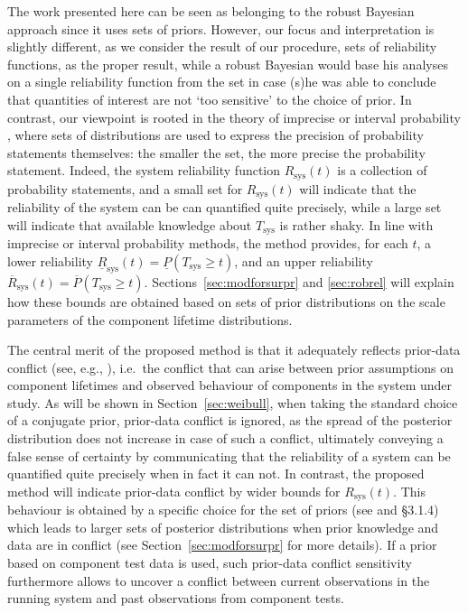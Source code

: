 \documentclass[Journal,SectionNumbers,InsideFigs]{ascelike}
\newcommand{\ul}[1]{\underline{#1}}
\newcommand{\ol}[1]{\overline{#1}}
\newcommand{\Rsys}{R_\text{sys}}
\newcommand{\lRsys}{\ul{R}_\text{sys}}
\newcommand{\uRsys}{\ol{R}_\text{sys}}
\def\Rsys{R_\text{sys}}
\def\Tsys{T_\text{sys}}
\begin{document}
The work presented here can be seen as belonging to the robust Bayesian approach
since it uses sets of priors. However, our focus and interpretation is slightly different,
as we consider the result of our procedure, sets of reliability functions, as the proper result,
while a robust Bayesian would base his analyses on a single reliability function from the set
in case (s)he was able to conclude that quantities of interest are not `too sensitive' to the choice of prior.
In contrast, our viewpoint is rooted in the theory of imprecise or interval probability \cite{1991:walley,itip},
where sets of distributions are used to express the precision of probability statements themselves:
the smaller the set, the more precise the probability statement.
Indeed, the system reliability function $\Rsys(t)$ is a collection of probability statements,
and a small set for $\Rsys(t)$ will indicate that the reliability of the system can be can quantified quite precisely,
while a large set will indicate that available knowledge about $\Tsys$ is rather shaky.
%
In line with imprecise or interval probability methods, the method provides, for each $t$,
a lower reliability $\lRsys(t) = \ul{P}(T_\text{sys} \geq t)$,
and an upper reliability $\uRsys(t) = \ol{P}(T_\text{sys} \geq t)$.
Sections~\ref{sec:modforsurpr} and \ref{sec:robrel} will explain how these bounds are obtained
based on sets of prior distributions on the scale parameters of the component lifetime distributions.

The central merit of the proposed method is that it adequately reflects prior-data conflict
(see, e.g., ),
i.e.\ the conflict that can arise between prior assumptions on component lifetimes
and observed behaviour of components in the system under study.
As will be shown in Section~\ref{sec:weibull}, when taking the standard choice of a conjugate prior,
prior-data conflict is ignored, as the spread of the posterior distribution does not increase in case of such a conflict,
ultimately conveying a false sense of certainty
by communicating that the reliability of a system can be quantified quite precisely when in fact it can not.
%
In contrast, the proposed method will indicate prior-data conflict by wider bounds for $\Rsys(t)$.
This behaviour is obtained by a specific choice for the set of priors (see  and  \S 3.1.4)
which leads to larger sets of posterior distributions when prior knowledge and data are in conflict
(see Section~\ref{sec:modforsurpr} for more details).
If a prior based on component test data is used,
such prior-data conflict sensitivity furthermore allows to uncover a conflict between
current observations in the running system and past observations from component tests.
\end{document}
